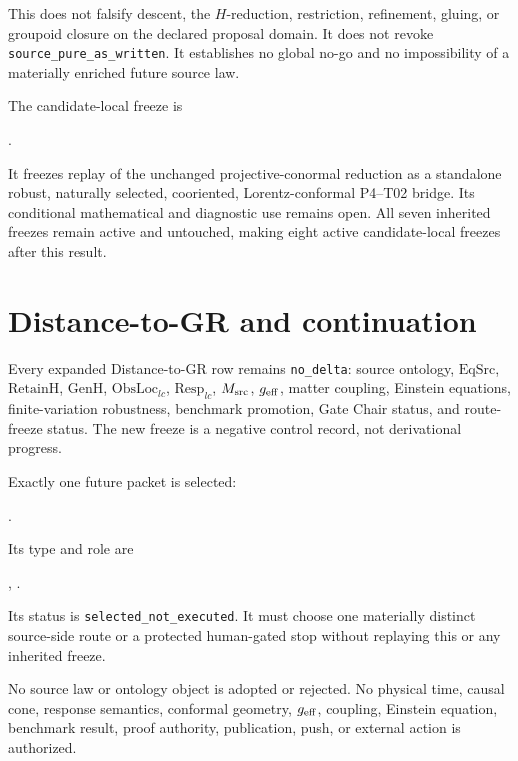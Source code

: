 \documentclass[11pt]{article}
\begin{document}
This does not falsify descent, the $H$-reduction, restriction, refinement,
gluing, or groupoid closure on the declared proposal domain.  It does not
revoke \texttt{source\_pure\_as\_written}.  It establishes no global no-go
and no impossibility of a materially enriched future source law.

The candidate-local freeze is
\begin{center}
\small
{}.
\end{center}
It freezes replay of the unchanged projective-conormal reduction as a
standalone robust, naturally selected, cooriented, Lorentz-conformal P4--T02
bridge.  Its conditional mathematical and diagnostic use remains open.  All
seven inherited freezes remain active and untouched, making eight active
candidate-local freezes after this result.

\section{Distance-to-GR and continuation}

Every expanded Distance-to-GR row remains \texttt{no\_delta}: source ontology,
$\mathrm{EqSrc}$, $\mathrm{RetainH}$, $\mathrm{GenH}$,
$\mathrm{ObsLoc}_{lc}$, $\mathrm{Resp}_{lc}$, $M_{\rm src}$, $g_{\rm eff}$,
matter coupling, Einstein equations, finite-variation robustness, benchmark
promotion, Gate Chair status, and route-freeze status.  The new freeze is a
negative control record, not derivational progress.

Exactly one future packet is selected:
\begin{center}
\small
{}.
\end{center}
Its type and role are
\begin{center}
\small
{},\qquad
{}.
\end{center}
Its status is \texttt{selected\_not\_executed}.  It must choose one materially distinct
source-side route or a protected human-gated stop without replaying this or
any inherited freeze.

No source law or ontology object is adopted or rejected.  No physical time,
causal cone, response semantics, conformal geometry, $g_{\rm eff}$, coupling,
Einstein equation, benchmark result, proof authority, publication, push, or
external action is authorized.
\end{document}
